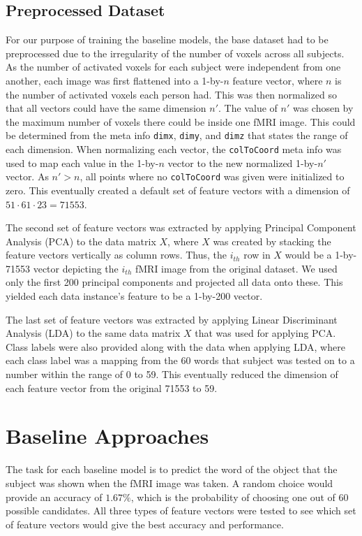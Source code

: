 \documentclass{article} %
\def\code#1{\texttt{#1}}
\begin{document}
\subsection{Preprocessed Dataset}

For our purpose of training the baseline models, the base dataset had to be preprocessed due to the irregularity of the number of voxels across all subjects. As the number of activated voxels for each subject were independent from one another, each image was first flattened into a 1-by-$n$ feature vector, where $n$ is the number of activated voxels each person had. This was then normalized so that all vectors could have the same dimension $n'$. The value of $n'$ was chosen by the maximum number of voxels there could be inside one fMRI image. This could be determined from the meta info \code{dimx}, \code{dimy}, and \code{dimz} that states the range of each dimension. When normalizing each vector, the \code{colToCoord} meta info was used to map each value in the 1-by-$n$ vector to the new normalized 1-by-$n'$ vector. As $n' > n$, all points where no \code{colToCoord} was given were initialized to zero. This eventually created a default set of feature vectors with a dimension of $51 \cdot 61 \cdot 23 = 71553$.

The second set of feature vectors was extracted by applying Principal Component Analysis (PCA) to the data matrix $X$, where $X$ was created by stacking the feature vectors vertically as column rows. Thus, the $i_{th}$ row in $X$ would be a 1-by-71553 vector depicting the $i_{th}$ fMRI image from the original dataset. We used only the first 200 principal components and projected all data onto these. This yielded each data instance's feature to be a 1-by-200 vector.

The last set of feature vectors was extracted by applying Linear Discriminant Analysis (LDA) to the same data matrix $X$ that was used for applying PCA. Class labels were also provided along with the data when applying LDA, where each class label was a mapping from the 60 words that subject was tested on to a number within the range of 0 to 59. This eventually reduced the dimension of each feature vector from the original 71553 to 59.

\section{Baseline Approaches}

The task for each baseline model is to predict the word of the object that the subject was shown when the fMRI image was taken. A random choice would provide an accuracy of $1.67\%$, which is the probability of choosing one out of 60 possible candidates. All three types of feature vectors were tested to see which set of feature vectors would give the best accuracy and performance.
\end{document}
